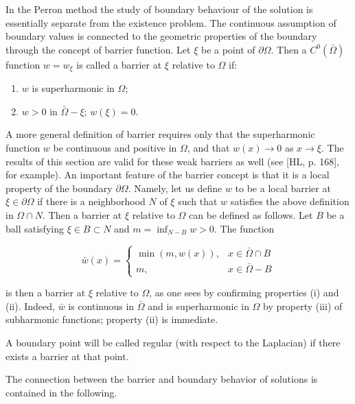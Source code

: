 In the Perron method the study of boundary behaviour of the solution is essentially separate from the existence problem. The continuous assumption of boundary values is connected to the geometric properties of the boundary through the concept of barrier function. Let $\xi$ be a point of $\partial \Omega$. Then a $C^0(\bar{\Omega})$ function $w = w_{\xi}$ is called a barrier at $\xi$ relative to $\Omega$ if:

\begin{enumerate}
\item[(i)] $w$ is superharmonic in $\Omega$;
\item[(ii)] $w > 0$ in $\bar{\Omega} - \xi$; $w(\xi)=0$.
\end{enumerate}

A more general definition of barrier requires only that the superharmonic function $w$ be continuous and positive in $\Omega$, and that $w(x) \to 0$ as $x \to \xi$. The results of this section are valid for these weak barriers as well (see [HL, p. 168], for example). An important feature of the barrier concept is that it is a local property of the boundary $\partial \Omega$. Namely, let us define $w$ to be a local barrier at $\xi \in \partial \Omega$ if there is a neighborhood $N$ of $\xi$ such that $w$ satisfies the above definition in $\Omega \cap N$. Then a barrier at $\xi$ relative to $\Omega$ can be defined as follows. Let $B$ be a ball satisfying $\xi \in B \subset N$ and $m = \inf_{N-B} w > 0$. The function

\[
\bar{w}(x) =
\begin{cases}
\min(m, w(x)), & x \in \bar{\Omega} \cap B \\
m, & x \in \bar{\Omega} - B
\end{cases}
\]

is then a barrier at $\xi$ relative to $\Omega$, as one sees by confirming properties (i) and (ii). Indeed, $\bar{w}$ is continuous in $\bar{\Omega}$ and is superharmonic in $\Omega$ by property (iii) of subharmonic functions; property (ii) is immediate.

A boundary point will be called regular (with respect to the Laplacian) if there exists a barrier at that point.

The connection between the barrier and boundary behavior of solutions is contained in the following.

\medskip

